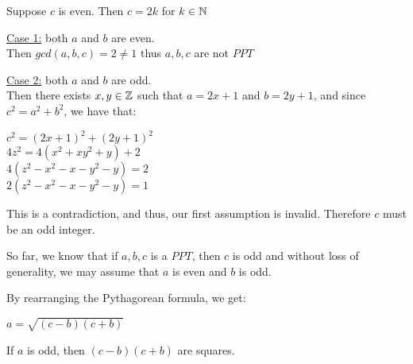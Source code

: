 \documentclass[main.tex]{subfiles}
\begin{document}
\begin{pf}
Suppose $c$ is even.
Then $c=2k$ for $k \in \mathbb{N}$


\underline{Case 1:} both $a$ and $b$ are even. \\
Then $gcd(a, b, c) = 2 \neq 1$ thus $a, b, c$ are not $PPT$

\underline{Case 2:} both $a$ and $b$ are odd. \\
Then there exists $x, y \in \mathbb{Z}$ such that $a = 2x + 1$ and $b = 2y + 1$, and since $c^2 = a^2 + b^2$, we have that:

\begin{center}
    $c^2 = (2x + 1)^2 + (2y + 1)^2$ \\
    $4z^2 = 4(x^2 + x y^2 + y) + 2$ \\
    $4(z^2 - x^2 - x - y^2 - y) = 2$ \\
    $2(z^2 - x^2 - x - y^2 - y) = 1$
\end{center}

This is a contradiction, and thus, our first assumption is invalid. Therefore $c$ must be an odd integer.
\end{pf}

So far, we know that if $a, b, c$ is a $PPT$, then $c$ is odd and without loss of generality, we may assume that $a$ is even and $b$ is odd.

By rearranging the Pythagorean formula, we get:

\centerline{$a = \sqrt{(c-b)(c+b)}$}

\begin{prop}
    If $a$ is odd, then $(c-b)(c+b)$ are squares.
\end{prop}
\end{document}
